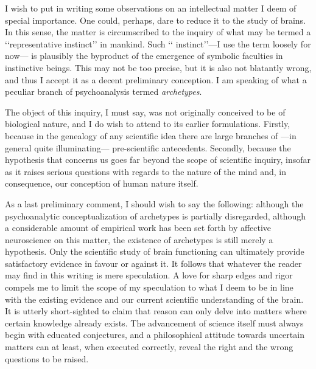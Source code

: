\documentclass[a4paper]{article}
\begin{document}
    I wish to put in writing some observations on an intellectual matter I deem
    of special importance. One could, perhaps, dare to reduce it to the study of
    brains. In this sense, the matter is circumscribed to the inquiry of what may be
    termed a \lq\lq representative instinct\rq\rq{} in mankind. Such \lq\lq
    instinct\rq\rq{}---I use the term loosely for now--- is plausibly the
    byproduct of the emergence of symbolic faculties in instinctive beings.
    This may not be too precise, but it is also not blatantly wrong, and thus I
    accept it as a decent preliminary conception. I am speaking of what a
    peculiar branch of psychoanalysis termed \textit{archetypes}.

    The object of this inquiry, I must say, was not originally conceived to be of
    biological nature, and I do wish to attend to its earlier formulations.
    Firstly, because in the genealogy of any scientific idea there are large
    branches of ---in general quite illuminating--- pre-scientific antecedents.
    Secondly, because the hypothesis that concerns us goes far beyond the scope of
    scientific inquiry, insofar as it raises serious questions with regards to
    the nature of the mind and, in consequence, our conception of human nature
    itself.

    As a last preliminary comment, I should wish to say the following: although
    the psychoanalytic conceptualization of archetypes is partially disregarded,
    although a considerable amount of empirical work has been set forth by
    affective neuroscience on this matter, the existence of archetypes is still
    merely a hypothesis. Only the scientific study of brain functioning can
    ultimately provide satisfactory evidence in favour or against it. It follows
    that whatever the reader may find in this writing is mere speculation. A
    love for sharp edges and rigor compels me to limit the scope of my
    speculation to what I deem to be in line with the existing evidence and our
    current scientific understanding of the brain. It is utterly short-sighted
    to claim that reason can only delve into matters where certain knowledge
    already exists. The advancement of science itself must always begin with
    educated conjectures, and a philosophical attitude towards uncertain matters
    can at least, when executed correctly, reveal the right and the
    wrong questions to be raised.
\end{document}
